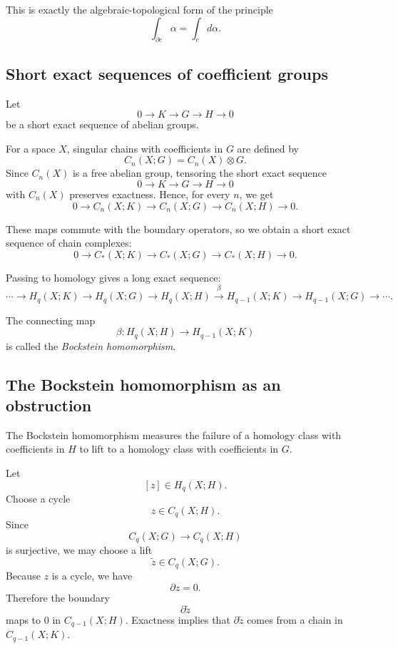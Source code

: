 \documentclass[12pt,a4paper]{article}
\theoremstyle{notespace}
\begin{document}
This is exactly the algebraic-topological form of the principle
\[
\boxed{
	\int_{\partial c}\alpha=\int_c d\alpha.
}
\]

\subsection{Short exact sequences of coefficient groups}

Let
\[
0
\longrightarrow
K
\longrightarrow
G
\longrightarrow
H
\longrightarrow
0
\]
be a short exact sequence of abelian groups.

For a space \(X\), singular chains with coefficients in \(G\) are defined by
\[
C_n(X;G)=C_n(X)\otimes G.
\]
Since \(C_n(X)\) is a free abelian group, tensoring the short exact sequence
\[
0\longrightarrow K\longrightarrow G\longrightarrow H\longrightarrow 0
\]
with \(C_n(X)\) preserves exactness. Hence, for every \(n\), we get
\[
0
\longrightarrow
C_n(X;K)
\longrightarrow
C_n(X;G)
\longrightarrow
C_n(X;H)
\longrightarrow
0.
\]

These maps commute with the boundary operators, so we obtain a short exact sequence of chain complexes:
\[
\boxed{
	0
	\longrightarrow
	C_*(X;K)
	\longrightarrow
	C_*(X;G)
	\longrightarrow
	C_*(X;H)
	\longrightarrow
	0.
}
\]

Passing to homology gives a long exact sequence:
\[
\cdots
\longrightarrow
H_q(X;K)
\longrightarrow
H_q(X;G)
\longrightarrow
H_q(X;H)
\xrightarrow{\beta}
H_{q-1}(X;K)
\longrightarrow
H_{q-1}(X;G)
\longrightarrow
\cdots .
\]

The connecting map
\[
\beta:H_q(X;H)\longrightarrow H_{q-1}(X;K)
\]
is called the \emph{Bockstein homomorphism}.

\subsection{The Bockstein homomorphism as an obstruction}

The Bockstein homomorphism measures the failure of a homology class with coefficients in \(H\) to lift to a homology class with coefficients in \(G\).

Let
\[
[z]\in H_q(X;H).
\]
Choose a cycle
\[
z\in C_q(X;H).
\]
Since
\[
C_q(X;G)\longrightarrow C_q(X;H)
\]
is surjective, we may choose a lift
\[
\widetilde z\in C_q(X;G).
\]
Because \(z\) is a cycle, we have
\[
\partial z=0.
\]
Therefore the boundary
\[
\partial \widetilde z
\]
maps to \(0\) in \(C_{q-1}(X;H)\). Exactness implies that \(\partial \widetilde z\) comes from a chain in \(C_{q-1}(X;K)\).
\end{document}
